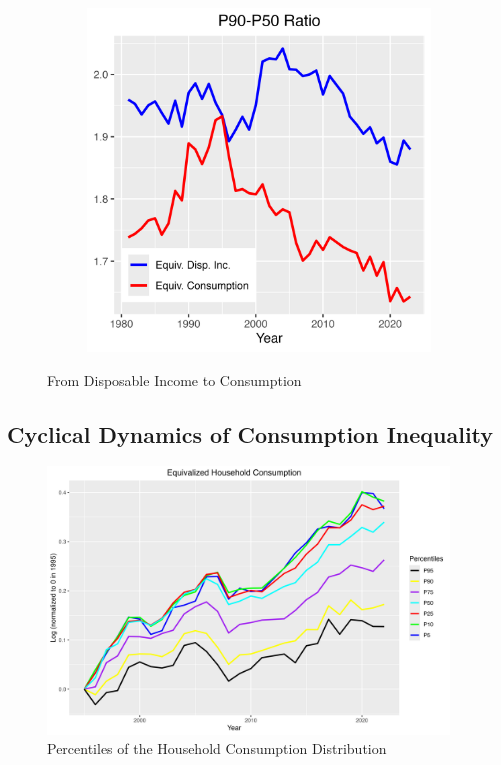 \documentclass{article}
\begin{document}
\begin{figure}
\begin{subfigure}[t]{0.475\textwidth}
        \label{fig:Consumption_P50_P10}
    \end{subfigure}
    \begin{subfigure}[t]{0.475\textwidth}
        \centering
        \includegraphics[width=\textwidth]{figures/Fig_6/Fig_6d.png}
        \label{fig:Consumption_P90_P50}
    \end{subfigure}
    \caption{From Disposable Income to Consumption}
    \label{fig:Consumption}
\end{figure}

\subsection{Cyclical Dynamics of Consumption Inequality}

\begin{figure}
    \centering
    \includegraphics[width=0.95\textwidth]{figures/Fig_7/Fig_7_percentiles_a1995.png}
    \caption{Percentiles of the Household Consumption Distribution}
    \label{fig:Consumption_cyclic}
\end{figure}
\end{document}
